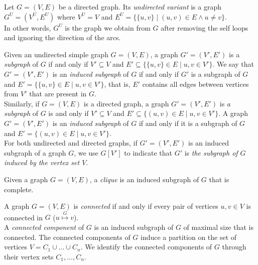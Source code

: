 \begin{definition}\label{def: undirected variant}
Let $G=(V,E)$ be a directed graph.
Its \emph{undirected variant} is a graph $G^U=(V^U,E^U)$ where 
$V^U=V$ and 
$E^U=\{ \{u,v\} \mid (u,v) \in E \wedge u \neq v\}$.\\
In other words, $G^U$ is the graph we obtain from $G$ after removing the self loops and ignoring the direction of the arcs.
\end{definition}


\begin{definition}[Subgraphs]
Given an undirected simple graph $G=(V,E)$, a graph $G'=(V',E')$ is a \emph{subgraph} of $G$ if and only if $V' \subseteq V$ and 
$E' \subseteq \{\{u,v\} \in E \mid u,v \in V'\}$.
We say that $G'=(V',E')$ is an \emph{induced subgraph} of $G$ if and only if $G'$ is a subgraph of $G$ and 
$E' = \{\{u,v\} \in E \mid u,v \in V'\}$, that is, $E'$ contains all edges between vertices from $V'$ that are present in $G$.\\ 
Similarly, if $G=(V,E)$ is a directed graph, a graph $G'=(V',E')$ is \emph{a subgraph} of $G$ is and only if $V' \subseteq V$ and 
$E' \subseteq \{(u,v) \in E \mid u,v \in V'\}$.
A graph $G'=(V',E')$ is an \emph{induced subgraph} of $G$ if and only if it is a subgraph of $G$ and 
$E' = \{(u,v) \in E \mid u,v \in V'\}$.\\
For both undirected and directed graphs, if $G'=(V',E')$ is an induced subgraph of a graph $G$, we use $G[V']$ to indicate that $G'$ is \emph{the subgraph of $G$ induced by the vertex set $V$}.
\end{definition}


\begin{definition}[Clique]
Given a graph $G=(V,E)$, a \emph{clique} is an induced subgraph of $G$ that is complete.
\end{definition}


\begin{definition}
A graph $G=(V,E)$ is \emph{connected} if and only if every pair of vertices $u,v \in V$ is connected in $G$ ($u \overset{G}{\mapsto} v$).\\
A \emph{connected component} of $G$ is an induced subgraph of $G$ of maximal size that is connected.
The connected components of $G$ induce a partition on the set of vertices $V = C_1 \cup ... \cup C_n$.
We identify the connected components of $G$ through their vertex sets $C_1,...,C_n$.
\end{definition}


